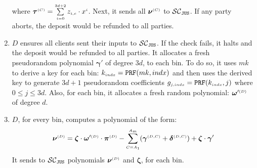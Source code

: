 \begin{enumerate}[leftmargin=4mm]
where $\bm\tau^{\scriptscriptstyle  {  {(C)}}}=\sum\limits^{\scriptscriptstyle 3d+2}_{\scriptscriptstyle i=0}z_{\scriptscriptstyle i,c}\cdot x^{\scriptscriptstyle i}$. Next, it sends  all $\bm\nu^{\scriptscriptstyle  {  {(C)}} }$ to $\mathcal{SC}_{\mathtt{JUS}}$. If any party aborts, the deposit would be refunded to all parties.










\item\label{f-psi::D-gen-random-poly} ${D}$ ensures all clients sent their inputs to $\mathcal{SC}_{\mathtt{JUS}}$. If the check fails, it halts and the deposit would be refunded to all parties. It allocates a fresh pseudorandom polynomial $\bm\gamma'$ of degree $3d$, to each bin. To do so, it uses $mk$ to derive a key for each bin: $k_{\scriptscriptstyle  { {indx}}}=\mathtt{PRF}(mk, {    {   {indx}}})$ and then uses the derived key to generate $3d+1$ pseudorandom coefficients $g_{\scriptscriptstyle  { {j,indx}}}=\mathtt{PRF}(k_{\scriptscriptstyle  { {indx}}}, j)$ where $ 0\leq j \leq 3d$. Also, for each bin, it allocates a fresh random polynomial:  $\bm\omega'^{\scriptscriptstyle  {  {(D)}}}$ of degree $d$. 

\item\label{f-psi::D-gen-switching-poly}  $ {D}$,  for every bin, computes a polynomial of the form:  
%
$$\bm\nu^{\scriptscriptstyle  {  {(D)}}}=\bm\zeta \cdot  \bm\omega'^{\scriptscriptstyle  {  {(D)}}}\cdot \bm\pi^{\scriptscriptstyle  {  {(D)}} }-\sum\limits^{\scriptscriptstyle  {   A}_{\scriptscriptstyle  {   m}}}_{\scriptscriptstyle   {  {C }= }   {   A}_{\scriptscriptstyle  {  1}}}(\bm\gamma^{\scriptscriptstyle  {  {(D,C)}}} + \bm\delta^{\scriptscriptstyle  {  {(D,C)}}}) + \bm\zeta \cdot \bm\gamma'$$ 
It sends to $\mathcal{SC}_{\mathtt{JUS}}$  polynomials $\bm\nu^{\scriptscriptstyle  {  {(D)}}}$ and $\bm\zeta$, for each bin.


\end{enumerate}
